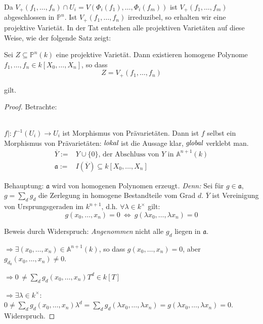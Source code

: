 Da $V_{+}(f_{1},\ldots,f_{n})\cap U_{i}=V(\Phi_{i}(f_{1}),\ldots,\Phi_{i}(f_{m}))$
ist $V_{+}(f_{1},\ldots,f_{m})$ abgeschlossen in $\mathbb{P}^{n}$.
Ist $V_{+}(f_{1},\ldots,f_{n})$ irreduzibel, so erhalten wir eine
projektive Varietät. In der Tat entstehen alle projektiven Varietäten
auf diese Weise, wie der folgende Satz zeigt:
\begin{prop}[orig. 55]
  \label{prop:charakterisierung-projektive-varietaeten}
  Sei $Z\subseteq\mathbb{P}^{n}(k)$ eine projektive Varietät. Dann
  existieren homogene Polynome $f_{1},\ldots,f_{n}\in k[X_{0},\ldots,X_{n}]$,
  so dass
  \[
    Z=V_{+}(f_{1},\ldots,f_{n})
  \]

  gilt.
\end{prop}
\begin{proof}
  Betrachte: 
  \[
    \begin{array}{cc}
      \\
      \\
    \end{array}
  \]

  $f| :f^{-1}(U_{i})\longrightarrow U_{i}$ ist Morphismus
  von Prävarietäten. Dann ist $f$ selbst ein Morphismus von Prävarietäten: $\emph{lokal}$ ist die Aussage klar, $\emph{global}$ verklebt man.
  \begin{align*}
    \overline{Y}:= & Y\cup\{0\}\text{, der Abschluss von }Y\text{ in }\mathbb{A}^{n+1}(k)\\
    \mathfrak{a}:= & I(\overline{Y})\subseteq k[X_{0},\ldots,X_{n}]
  \end{align*}

  Behauptung: $\mathfrak{a}$ wird von homogenen Polynomen erzeugt\emph{.
    Denn:} Sei für $g\in\mathfrak{a}$, $g=\sum_{d}g_{d}$ die Zerlegung in homogene
  Bestandteile vom Grad $d$. $\overline{Y}$ ist Vereinigung von Ursprungsgeraden
  im $k^{n+1}$, d.h. $\forall\lambda\in k^{\times}$ gilt:
  \[
    g(x_{0},\ldots,x_{n})=0\ \Leftrightarrow\ g(\lambda x_{0},\ldots,\lambda x_{n})=0
  \]

  Beweis durch Widerspruch: \emph{Angenommen} nicht alle $g_{d}$ liegen in $\mathfrak{a}$.

  $\Rightarrow\exists(x_{0},\ldots,x_{n})\in\mathbb{A}^{n+1}(k)$, so
  dass $g(x_{0},\ldots,x_{n})=0$, aber $g_{d_{0}}(x_{0},\ldots,x_{n})\neq0$.

  $\Rightarrow0\,\neq\sum_{d}g_{d}(x_{0},\ldots,x_{n})T^{d}\in k[T]$

  $\Rightarrow\exists\lambda\in k^{\times}$: $0\neq\sum_{d}g_{d}(x_{0},\ldots,x_{n})\lambda^{d}=\sum_{d}g_{d}(\lambda x_{0},\ldots,\lambda x_{n})=g(\lambda x_{0},\ldots,\lambda x_{n})=0$.
  Widerspruch.


\end{proof}
